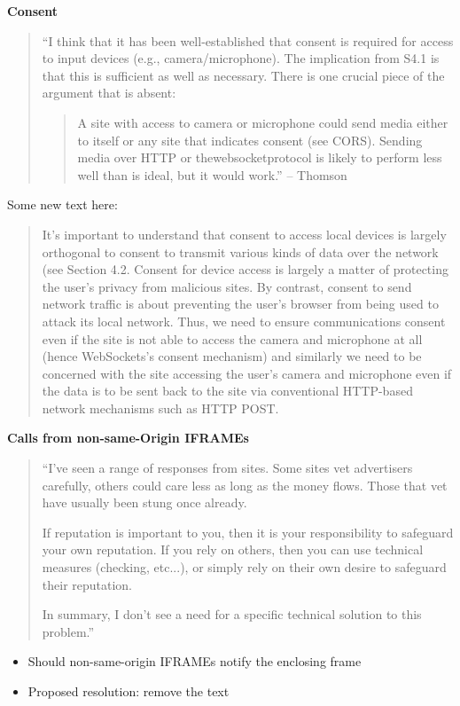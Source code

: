 \documentclass[helvetica]{seminar}
\newcommand{\heading}[1]{%
  \begin{center} 
    \large\bf 
    #1 
  \end{center} 
  \vspace{.4 in}}
\begin{document}
\begin{slide}
\heading{Consent}

{\scriptsize
\begin{quote}
``I think that it has been well-established that consent is required for
access to input devices (e.g., camera/microphone).  The implication from
S4.1 is that this is sufficient as well as necessary.  There is one
crucial piece of the argument that is absent:

\begin{quote}
A site with access to camera or microphone could send media either to
itself or any site that indicates consent (see CORS).  Sending media
over HTTP or thewebsocketprotocol is likely to perform less well than
is ideal, but it would work.'' -- Thomson
\end{quote}
\end{quote}

Some new text here:

\begin{quote}
It's important to understand that consent to access local devices is
largely orthogonal to consent to transmit various kinds of data over
the network (see Section 4.2.  Consent for device access is largely a
matter of protecting the user's privacy from malicious sites.  By
contrast, consent to send network traffic is about preventing the
user's browser from being used to attack its local network.  Thus, we
need to ensure communications consent even if the site is not able to
access the camera and microphone at all (hence WebSockets's consent
mechanism) and similarly we need to be concerned with the site
accessing the user's camera and microphone even if the data is to be
sent back to the site via conventional HTTP-based network mechanisms
such as HTTP POST.
\end{quote}
}
\end{slide}

\begin{slide}
\heading{Calls from non-same-Origin IFRAMEs}

{\footnotesize
\begin{quote}
``I've seen a range of responses from sites.  Some sites vet advertisers
carefully, others could care less as long as the money flows.  Those
that vet have usually been stung once already.

If reputation is important to you, then it is your responsibility to
safeguard your own reputation.  If you rely on others, then you can
use technical measures (checking, etc...), or simply rely on their own
desire to safeguard their reputation.

In summary, I don't see a need for a specific technical solution to
this problem.''
\end{quote}
}

\begin{itemize}
\item Should non-same-origin IFRAMEs notify the enclosing frame
\item Proposed resolution: remove the text
\end{itemize}
\end{slide}
\end{document}
